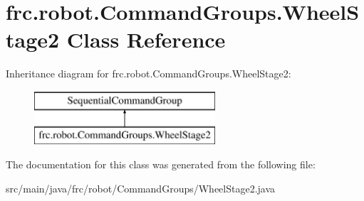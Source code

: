 \hypertarget{classfrc_1_1robot_1_1_command_groups_1_1_wheel_stage2}{}\section{frc.\+robot.\+Command\+Groups.\+Wheel\+Stage2 Class Reference}
\label{classfrc_1_1robot_1_1_command_groups_1_1_wheel_stage2}
Inheritance diagram for frc.\+robot.\+Command\+Groups.\+Wheel\+Stage2\+:\begin{figure}[H]
\begin{center}
\leavevmode
\includegraphics[height=2.000000cm]{classfrc_1_1robot_1_1_command_groups_1_1_wheel_stage2}
\end{center}
\end{figure}


The documentation for this class was generated from the following file\+:\begin{DoxyCompactItemize}
\item 
src/main/java/frc/robot/\+Command\+Groups/Wheel\+Stage2.\+java\end{DoxyCompactItemize}
